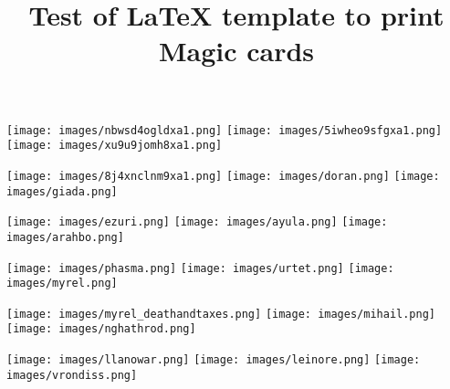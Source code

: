 \documentclass[a4paper,12pt]{article}
\title{Test of LaTeX template to print Magic cards}
\begin{document}
\thispagestyle{empty}


\texttt{[image: images/nbwsd4ogldxa1.png]}
\texttt{[image: images/5iwheo9sfgxa1.png]}
\texttt{[image: images/xu9u9jomh8xa1.png]}

\texttt{[image: images/8j4xnclnm9xa1.png]}
\texttt{[image: images/doran.png]}
\texttt{[image: images/giada.png]}

\texttt{[image: images/ezuri.png]}
\texttt{[image: images/ayula.png]}
\texttt{[image: images/arahbo.png]}


\texttt{[image: images/phasma.png]}
\texttt{[image: images/urtet.png]}
\texttt{[image: images/myrel.png]}

\texttt{[image: images/myrel\_deathandtaxes.png]}
\texttt{[image: images/mihail.png]}
\texttt{[image: images/nghathrod.png]}

\texttt{[image: images/llanowar.png]}
\texttt{[image: images/leinore.png]}
\texttt{[image: images/vrondiss.png]}

\end{document}
